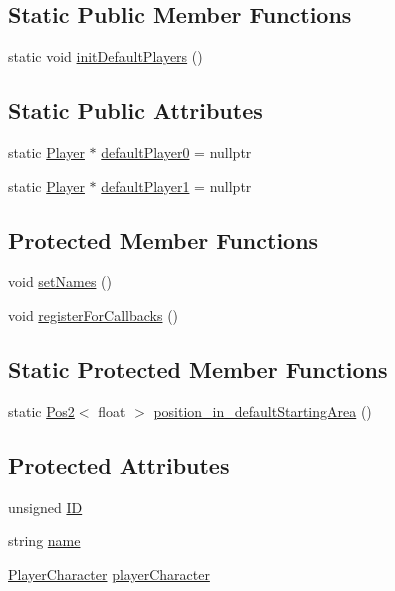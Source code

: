 \subsection*{Static Public Member Functions}
\begin{DoxyCompactItemize}
\item 
static void \hyperlink{class_player_ab2e78e5057e753e94a53592dfaff1929}{init\-Default\-Players} ()
\end{DoxyCompactItemize}
\subsection*{Static Public Attributes}
\begin{DoxyCompactItemize}
\item 
static \hyperlink{class_player}{Player} $\ast$ \hyperlink{class_player_a13d309a31f4fc49b249ed471c610661c}{default\-Player0} = nullptr
\item 
static \hyperlink{class_player}{Player} $\ast$ \hyperlink{class_player_aff6bf1fbf9a588c0b89ec3375720b80e}{default\-Player1} = nullptr
\end{DoxyCompactItemize}
\subsection*{Protected Member Functions}
\begin{DoxyCompactItemize}
\item 
void \hyperlink{class_player_ac63b593fbf28b4af6e042494b99e128d}{set\-Names} ()
\item 
void \hyperlink{class_player_a3c66b7899da516d8b0a73901ab9de1fb}{register\-For\-Callbacks} ()
\end{DoxyCompactItemize}
\subsection*{Static Protected Member Functions}
\begin{DoxyCompactItemize}
\item 
static \hyperlink{struct_pos2}{Pos2}$<$ float $>$ \hyperlink{class_player_a285eabefec2d2256399f4a9e96649a54}{position\-\_\-in\-\_\-default\-Starting\-Area} ()
\end{DoxyCompactItemize}
\subsection*{Protected Attributes}
\begin{DoxyCompactItemize}
\item 
unsigned \hyperlink{class_player_a681c4a2c3b35c7e071cde859fb8ed167}{I\-D}
\item 
string \hyperlink{class_player_acf0355128a99ee20ad9931b760fb2de1}{name}
\item 
\hyperlink{class_player_character}{Player\-Character} \hyperlink{class_player_a64a52a100bf7dc8a1a1836d1656e5321}{player\-Character}
\end{DoxyCompactItemize}
